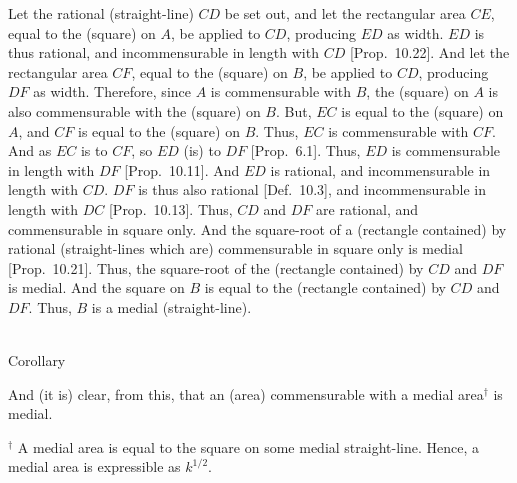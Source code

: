 \begin{Parallel}{}{}
{Let the rational (straight-line) $CD$ be set out, and let the rectangular
area $CE$, equal to the (square) on $A$, be applied to $CD$,
producing $ED$ as width. $ED$ is thus rational, and incommensurable
in length with $CD$ [Prop.~10.22]. And
let the rectangular area $CF$, equal to the (square) on $B$, be
applied to $CD$, producing $DF$ as width.
Therefore, since $A$ is commensurable with $B$, the (square) on $A$
is also commensurable with the (square) on $B$.  But, $EC$ is equal
to the (square) on $A$, and $CF$ is equal to the (square) on $B$. Thus,
$EC$ is commensurable with $CF$. And as $EC$ is to $CF$, so $ED$ (is)
to $DF$ [Prop.~6.1]. Thus, $ED$ is commensurable
in  length with $DF$ [Prop.~10.11]. And $ED$
is rational, and incommensurable in length with $CD$.  $DF$ is thus
 also rational [Def.~10.3], and incommensurable in length with $DC$  [Prop.~10.13]. Thus,
 $CD$ and $DF$ are rational, and commensurable in square only.
 And the square-root of a (rectangle contained) by rational (straight-lines which are)
 commensurable in square only is medial [Prop.~10.21]. Thus, the square-root of the
 (rectangle contained) by $CD$ and $DF$ is medial.
 And the square on $B$ is equal to
 the (rectangle contained) by $CD$ and $DF$. Thus, $B$ is a medial (straight-line).
 
\epsfysize=2.1in
\centerline{}
 
\begin{center}~\\
 {\large Corollary}
 \end{center}\vspace*{-7pt}
 
 And (it is) clear, from this, that an (area) commensurable with a medial 
 area$^\dag$ is medial.}
\end{Parallel}
{\footnotesize\noindent$^\dag$ A medial area is equal to the square on some medial straight-line. Hence, a medial area is expressible as $k^{1/2}$.}
 

